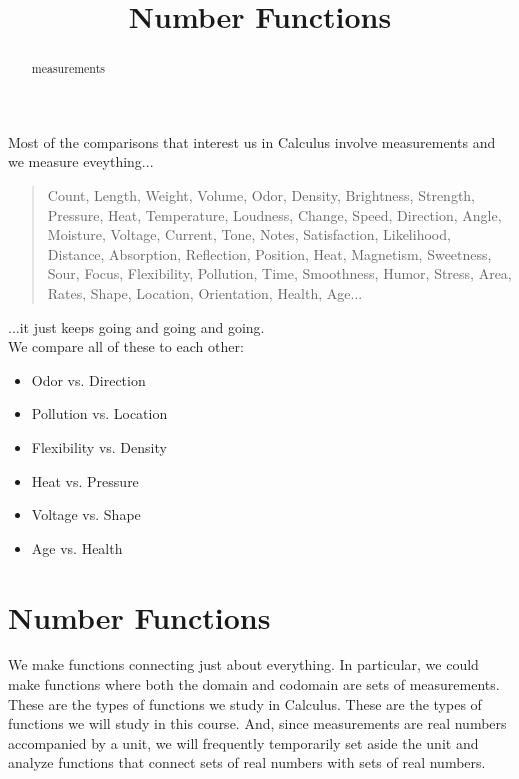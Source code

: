 \documentclass{ximera}
\title{Number Functions}
\begin{document}
\begin{abstract}
measurements
\end{abstract}
\maketitle





Most of the comparisons that interest us in Calculus involve measurements and we measure eveything...\\

\begin{quote}
Count, Length, Weight, Volume, Odor, Density, Brightness, Strength, Pressure, Heat, Temperature, Loudness, Change, Speed, Direction, Angle, Moisture, Voltage, Current, Tone, Notes, Satisfaction, Likelihood, Distance, Absorption, Reflection, Position, Heat, Magnetism, Sweetness, Sour, Focus, Flexibility, Pollution, Time, Smoothness, Humor, Stress, Area, Rates, Shape, Location, Orientation, Health, Age... \\
\end{quote}


...it just keeps going and going and going. \\


We compare all of these to each other:



\begin{itemize}
\item Odor vs. Direction
\item Pollution vs. Location
\item Flexibility vs. Density
\item Heat vs. Pressure
\item Voltage vs. Shape 
\item Age vs. Health
\end{itemize}







\section{Number Functions}

We make functions connecting just about everything.  In particular, we could make functions where both the domain and codomain are sets of measurements. These are the types of functions we study in Calculus.  These are the types of functions we will study in this course.  And, since measurements are real numbers accompanied by a unit, we will frequently temporarily set aside the unit and analyze functions that connect sets of real numbers with sets of real numbers. \\
\end{document}
